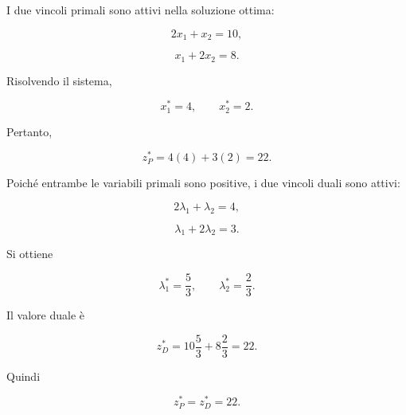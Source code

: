 I due vincoli primali sono attivi nella soluzione ottima:

\[
2x_1+x_2=10,
\]

\[
x_1+2x_2=8.
\]

Risolvendo il sistema,

\[
x_1^*=4,
\qquad
x_2^*=2.
\]

Pertanto,

\[
z_P^*
=
4(4)+3(2)
=
22.
\]

Poich\'e entrambe le variabili primali sono positive, i due vincoli duali
sono attivi:

\[
2\lambda_1+\lambda_2=4,
\]

\[
\lambda_1+2\lambda_2=3.
\]

Si ottiene

\[
\lambda_1^*=\frac{5}{3},
\qquad
\lambda_2^*=\frac{2}{3}.
\]

Il valore duale \`e

\[
z_D^*
=
10\frac{5}{3}
+
8\frac{2}{3}
=
22.
\]

Quindi

\[
z_P^*=z_D^*=22.
\]


